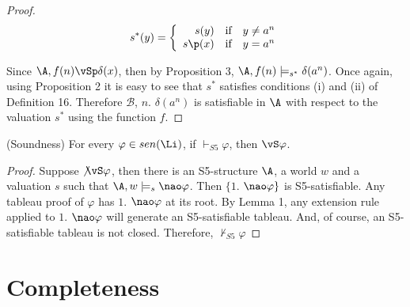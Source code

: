 \begin{proof}
$$
s^{*}(y) = \left\{
\begin{array}{rcl}
s(y) & \mbox{if} & y \neq a^{n}\\
s\p(x) & \mbox{if} & y = a^{n}\\
\end{array}
\right.
$$

\qquad Since $\A, f(n)\vSp \delta(x)$, then by Proposition 3, $\A, f(n)\models_{s^{*}} \delta(a^n)$. Once again, using Proposition 2 it is easy to see that $s^{*}$ satisfies conditions (i) and (ii) of Definition 16. Therefore $\mathcal{B}$,  $n.$ $\delta(a^{n})$ is satisfiable in $\A$ with respect to the valuation $s^{*}$ using the function $f$.
\end{proof}


\begin{teor}
(Soundness) For every $\varphi \in sen(\Li)$, if $\vdash_{S5} \varphi$, then $\vS \varphi$.
\end{teor}


\begin{proof}
Suppose $\not\vS \varphi$, then there is an S5-structure $\A$, a world $w$ and a valuation $s$ such that $\A, w\models_{s} \nao\varphi$. Then $\{1.$ $\nao \varphi\}$ is S5-satisfiable. Any tableau proof of $\varphi$ has $1.$ $\nao \varphi$ at its root. By Lemma 1, any extension rule applied to $1.$ $\nao \varphi$ will generate an S5-satisfiable tableau. And, of course, an S5-satisfiable tableau is not closed. Therefore, $\not \vdash_{S5} \varphi$
\end{proof}

\section{Completeness}


